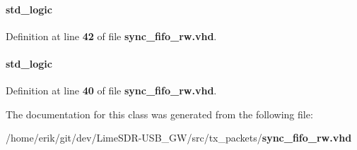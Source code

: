 \paragraph[{wrfull}]{ {\bfseries \textcolor{comment}{std\+\_\+logic}\textcolor{vhdlchar}{ }} \hspace{0.3cm}{\ttfamily [Signal]}}\label{classsync__fifo__rw_1_1arch_a04e17eba888a5e44842fe606655873c3}


Definition at line {\bf 42} of file {\bf sync\+\_\+fifo\+\_\+rw.\+vhd}.

\paragraph[{wrreq}]{ {\bfseries \textcolor{comment}{std\+\_\+logic}\textcolor{vhdlchar}{ }} \hspace{0.3cm}{\ttfamily [Signal]}}\label{classsync__fifo__rw_1_1arch_a8de7261703bfd9ddc5cf7aa755d710f8}


Definition at line {\bf 40} of file {\bf sync\+\_\+fifo\+\_\+rw.\+vhd}.



The documentation for this class was generated from the following file\+:\begin{DoxyCompactItemize}
\item 
/home/erik/git/dev/\+Lime\+S\+D\+R-\/\+U\+S\+B\+\_\+\+G\+W/src/tx\+\_\+packets/{\bf sync\+\_\+fifo\+\_\+rw.\+vhd}\end{DoxyCompactItemize}
